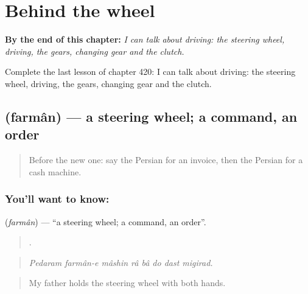
\chapter{Behind the wheel}
\label{ch:fa-behind-the-wheel}

\begin{chapteropening}
\textbf{By the end of this chapter:} \emph{I can talk about driving: the steering wheel, driving, the gears, changing gear and the clutch.}

Complete the last lesson of chapter 420: I can talk about driving: the steering wheel, driving, the gears, changing gear and the clutch.
\end{chapteropening}

\section[\texorpdfstring{\fa{فرمان} (farmân)}{فرمان (farmân)}]{ (farmân) — a steering wheel; a command, an order}

\label{lesson:FA-C420-farman}



\begin{quote}
Before the new one: say the Persian for an invoice, then the Persian for a cash machine.
\end{quote}

\subsection*{You'll want to know: }
\textbf{} (\emph{farmân}) — \textquotedblleft{}a steering wheel; a command, an order\textquotedblright{}.

\begin{quote}
       .
\end{quote}

\begin{quote}
\emph{Pedaram farmân-e mâshin râ bâ do dast migirad.}
\end{quote}

\begin{quote}
My father holds the steering wheel with both hands.
\end{quote}

